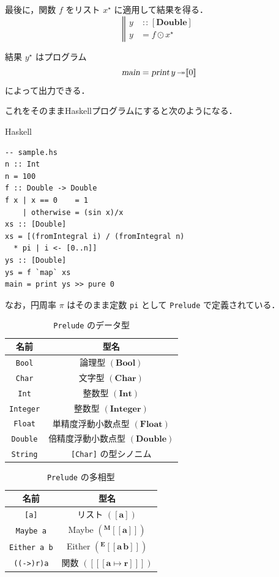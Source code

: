 \documentclass[a5paper,twoside,fleqn,draft]{jsbook}
\def\[{[\![}
\def\]{]\!]}
\newcommand{\programminglanguage}[1]{\textsf{#1}}
\newcommand{\haskell}{\programminglanguage{Haskell}}
\newcommand{\code}[1]{\texttt{#1}}
\newcommand{\filename}[1]{\texttt{#1}}
\newenvironment{haskellcode}{\begin{itembox}[r]{\haskell}}{\end{itembox}}
\newcommand{\mBrace}{\Vert}
\newcommand{\mAction}[1]{\textsl{#1}}
\DeclareMathOperator{\mMain}{\mAction{main}}
\DeclareMathOperator{\mPrint}{\mAction{print}}
\DeclareMathOperator{\mBindRightIgnore}{\twoheadrightarrow}
\DeclareMathOperator{\mIn}{{:\!:}}
\DeclareMathOperator{\mMapList}{\odot}
\DeclareMathOperator{\mMapsTo}{\mapsto}
\newcommand{\mType}[1]{\mathbf{#1}} %
\newcommand{\mA}{\mType{a}}
\newcommand{\mBoolType}{\mType{Bool}}
\newcommand{\mCharType}{\mType{Char}}
\newcommand{\mFloatType}{\mType{Float}}
\newcommand{\mDoubleType}{\mType{Double}}
\newcommand{\mIntType}{\mType{Int}}
\newcommand{\mIntegerType}{\mType{Integer}}
\newcommand{\mFuncType}[2]{[[[\mType{#1}\mMapsTo\mType{#2}]]]}
\newcommand{\mTypeAssemble}[2]{{}^\mType{#1}\[\mType{#2}\]}
\newcommand{\mTypeAssembleII}[3]{{}^\mType{#1}\[\mType{#2}\,\mType{#3}\]}
\newcommand{\mEitherType}[2]{\mTypeAssembleII{E}{#1}{#2}}
\newcommand{\mMaybeType}[1]{\mTypeAssemble{M}{#1}}
\newcommand{\mPureWith}[1]{\[#1\]}
\newcommand{\mList}[1]{{#1}^\mathrm{\star}}
\begin{document}
最後に，関数 $f$ をリスト $\mList{x}$ に適用して結果を得る．
\begin{equation}
  \left\mBrace
  \begin{aligned}
    y
    &\mIn{}[\mDoubleType]\\
    y
    &=f\mMapList\mList{x}
  \end{aligned}
  \right.
\end{equation}

結果 $\mList{y}$ はプログラム
\begin{equation}
\mMain=\mPrint y\mBindRightIgnore\mPureWith{0}
\end{equation}
によって出力できる．

これをそのまま\haskell プログラムにすると次のようになる．
\begin{haskellcode}
\begin{verbatim}
-- sample.hs
n :: Int
n = 100
f :: Double -> Double
f x | x == 0    = 1
    | otherwise = (sin x)/x
xs :: [Double]
xs = [(fromIntegral i) / (fromIntegral n)
  * pi | i <- [0..n]]
ys :: [Double]
ys = f `map` xs
main = print ys >> pure 0
\end{verbatim}
\end{haskellcode}

なお，円周率 $\pi$ はそのまま定数 \code{pi} として \filename{Prelude}
で定義されている．

\begin{table}
\caption{\filename{Prelude} のデータ型}
\label{tab:data-types}
\begin{center}
\begin{tabular}{||c|c||}
\hline
名前&型名\\
\hline\hline
\code{Bool}&論理型 $(\mBoolType)$\\
\code{Char}&文字型 $(\mCharType)$\\
\code{Int}&整数型 $(\mIntType)$\\
\code{Integer}&整数型 $(\mIntegerType)$\\
\code{Float}&単精度浮動小数点型 $(\mFloatType)$\\
\code{Double}&倍精度浮動小数点型 $(\mDoubleType)$\\
\code{String}&\code{[Char]} の型シノニム\\
\hline
\end{tabular}
\end{center}
\end{table}

\begin{table}
\caption{\filename{Prelude} の多相型}
\label{tab:data-types-polymorphic}
\begin{center}
\begin{tabular}{||c|c||}
\hline
名前&型名\\
\hline\hline
\code{[a]}&リスト $([\mA])$\\
\code{Maybe a}&Maybe $\left(\mMaybeType{a}\right)$\\
\code{Either a b}&Either $\left(\mEitherType{a}{b}\right)$\\
\code{((->)r)a}&関数 $\left(\mFuncType{a}{r}\right)$\\
\hline
\end{tabular}
\end{center}
\end{table}
\end{document}
